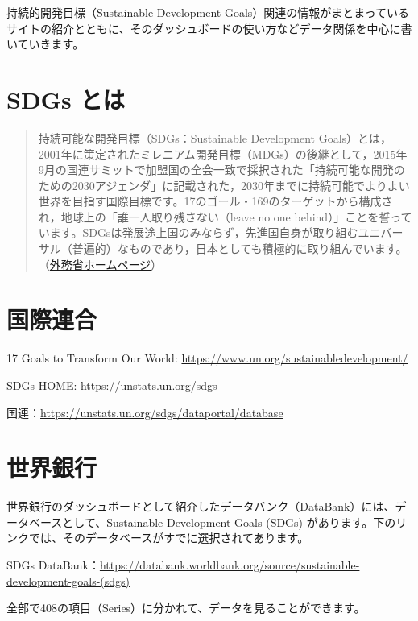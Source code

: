 \documentclass[
  xelatex, ja=standard]{bxjsbook}
\theoremstyle{definition}
\theoremstyle{definition}
\theoremstyle{definition}
\theoremstyle{definition}
\theoremstyle{remark}
\begin{document}
持続的開発目標（Sustainable Development Goals）関連の情報がまとまっているサイトの紹介とともに、そのダッシュボードの使い方などデータ関係を中心に書いていきます。

\hypertarget{sdgs-ux3068ux306f}{%
\section{SDGs とは}\label{sdgs-ux3068ux306f}}

\begin{quote}
持続可能な開発目標（SDGs：Sustainable Development Goals）とは，2001年に策定されたミレニアム開発目標（MDGs）の後継として，2015年9月の国連サミットで加盟国の全会一致で採択された「持続可能な開発のための2030アジェンダ」に記載された，2030年までに持続可能でよりよい世界を目指す国際目標です。17のゴール・169のターゲットから構成され，地球上の「誰一人取り残さない（leave no one behind）」ことを誓っています。SDGsは発展途上国のみならず，先進国自身が取り組むユニバーサル（普遍的）なものであり，日本としても積極的に取り組んでいます。（\href{https://www.mofa.go.jp/mofaj/gaiko/oda/sdgs/about/index.html}{外務省ホームページ}）
\end{quote}

\hypertarget{ux56fdux969bux9023ux5408}{%
\section{国際連合}\label{ux56fdux969bux9023ux5408}}

17 Goals to Transform Our World: \url{https://www.un.org/sustainabledevelopment/}

SDGs HOME: \url{https://unstats.un.org/sdgs}

国連：\url{https://unstats.un.org/sdgs/dataportal/database}

\hypertarget{ux4e16ux754cux9280ux884c}{%
\section{世界銀行}\label{ux4e16ux754cux9280ux884c}}

世界銀行のダッシュボードとして紹介したデータバンク（DataBank）には、データベースとして、Sustainable Development Goals (SDGs) があります。下のリンクでは、そのデータベースがすでに選択されてあります。

SDGs DataBank：\url{https://databank.worldbank.org/source/sustainable-development-goals-(sdgs)}

全部で408の項目（Series）に分かれて、データを見ることができます。
\end{document}

